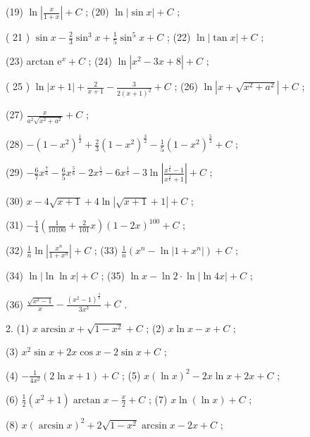 (19) \(\ln \left| \frac{x}{1 + x}\right|  + C\) ; (20) \(\ln \left| {\sin x}\right|  + C\) ;

( 21 ) \(\sin x - \frac{2}{3}{\sin }^{3}x + \frac{1}{5}{\sin }^{5}x + C\) ; (22) \(\ln \left| {\tan x}\right|  + C\) ;

(23) arctan \({\mathrm{e}}^{x} + C\) ; (24) \(\ln \left| {{x}^{2} - {3x} + 8}\right|  + C\) ;

( 25 ) \(\ln \left| {x + 1}\right|  + \frac{2}{x + 1} - \frac{3}{2{\left( x + 1\right) }^{2}} + C\) ; (26) \(\ln \left| {x + \sqrt{{x}^{2} + {a}^{2}}}\right|  + C\) ;

(27) \(\frac{x}{{a}^{2}\sqrt{{x}^{2} + {a}^{2}}} + C\) ;

(28) \(- {\left( 1 - {x}^{2}\right) }^{\frac{1}{2}} + \frac{2}{3}{\left( 1 - {x}^{2}\right) }^{\frac{3}{2}} - \frac{1}{5}{\left( 1 - {x}^{2}\right) }^{\frac{5}{2}} + C\) ;

(29) \(- \frac{6}{7}{x}^{\frac{7}{6}} - \frac{6}{5}{x}^{\frac{5}{6}} - 2{x}^{\frac{1}{2}} - 6{x}^{\frac{1}{6}} - 3\ln \left| \frac{{x}^{\frac{1}{6}} - 1}{{x}^{\frac{1}{6}} + 1}\right|  + C\) ;

(30) \(x - 4\sqrt{x + 1} + 4\ln \left| {\sqrt{x + 1} + 1}\right|  + C\) ;

(31) \(- \frac{1}{4}\left( {\frac{1}{10100} + \frac{2}{101}x}\right) {\left( 1 - 2x\right) }^{100} + C\) ;

(32) \(\frac{1}{n}\ln \left| \frac{{x}^{n}}{1 + {x}^{n}}\right|  + C\) ; (33) \(\frac{1}{n}\left( {{x}^{n} - \ln \left| {1 + {x}^{n}}\right| }\right)  + C\) ;

(34) \(\ln \left| {\ln \ln x}\right|  + C\) ; (35) \(\ln x - \ln 2 \cdot  \ln \left| {\ln {4x}}\right|  + C\) ;

(36) \(\frac{\sqrt{{x}^{2} - 1}}{x} - \frac{{\left( {x}^{2} - 1\right) }^{\frac{3}{2}}}{3{x}^{3}} + C\) .

2. (1) \(x\arcsin x + \sqrt{1 - {x}^{2}} + C\) ; (2) \(x\ln x - x + C\) ;

(3) \({x}^{2}\sin x + {2x}\cos x - 2\sin x + C\) ;

(4) \(- \frac{1}{4{x}^{2}}\left( {2\ln x + 1}\right)  + C\) ; (5) \(x{\left( \ln x\right) }^{2} - {2x}\ln x + {2x} + C\) ;

(6) \(\frac{1}{2}\left( {{x}^{2} + 1}\right) \arctan x - \frac{x}{2} + C\) ; (7) \(x\ln \left( {\ln x}\right)  + C\) ;

(8) \(x{\left( \arcsin x\right) }^{2} + 2\sqrt{1 - {x}^{2}}\arcsin x - {2x} + C\) ;

